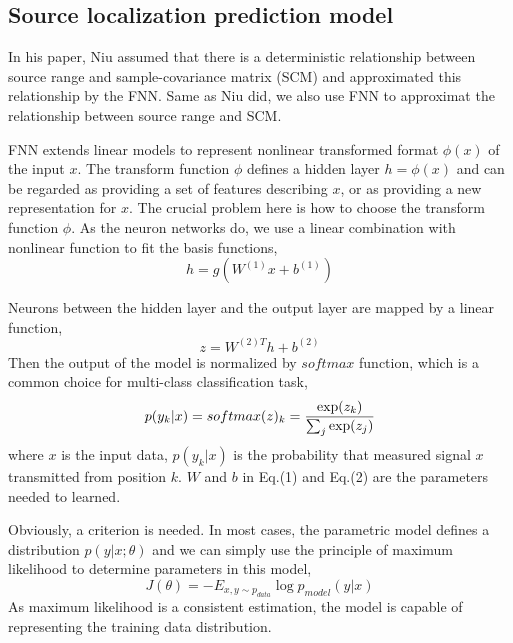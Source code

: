\subsection{Source localization prediction model}
In his paper\cite{niu2017source}, Niu assumed that there is a deterministic relationship between source range and sample-covariance matrix (SCM) and approximated this relationship by the FNN. Same as Niu did, we also use FNN to approximat the relationship between
source range and SCM.

FNN extends linear models to represent nonlinear transformed format $\phi(x)$ of the input $x$. The transform function $\phi$ defines a hidden layer $h=\phi(x)$ and can be regarded as providing a set of features describing $x$, or as providing a new representation for $x$. The crucial problem here is how to choose the transform function $\phi$. As the neuron networks do, we use a linear combination with nonlinear function to fit the basis functions,
\begin{equation}
h = g(W^{(1)}x + b^{(1)})
\end{equation}

Neurons between the hidden layer and the output layer are mapped by a linear function,
\begin{equation}
z = {W^{(2)T}}h + {b^{(2)}}
\end{equation}
Then the output of the model is normalized by $ softmax $ function, which is a common choice for multi-class classification task\cite{bishop2006pattern},
\begin{equation}
p({y_k}|x) = softmax {(z)_k} = {{\exp ({z_k})} \over {\sum\nolimits_j {\exp ({z_j})} }}
\end{equation}
where $x$ is the input data, $p({y_k}|x)$ is the probability that measured signal $x$ transmitted from position $k$. $W$ and $b$ in Eq.(1) and Eq.(2) are the parameters needed to learned.

Obviously, a criterion is needed. In most cases, the parametric model defines a distribution $p(y|x;\theta)$ and we can simply use the principle of maximum likelihood to determine parameters in this model,
\begin{equation}
J(\theta ) =  - {E_{x,y \sim {p_{data}}}}\log {p_{model}}(y|x)
\end{equation}
As maximum likelihood is a consistent estimation, the model is capable of representing the training data distribution.

